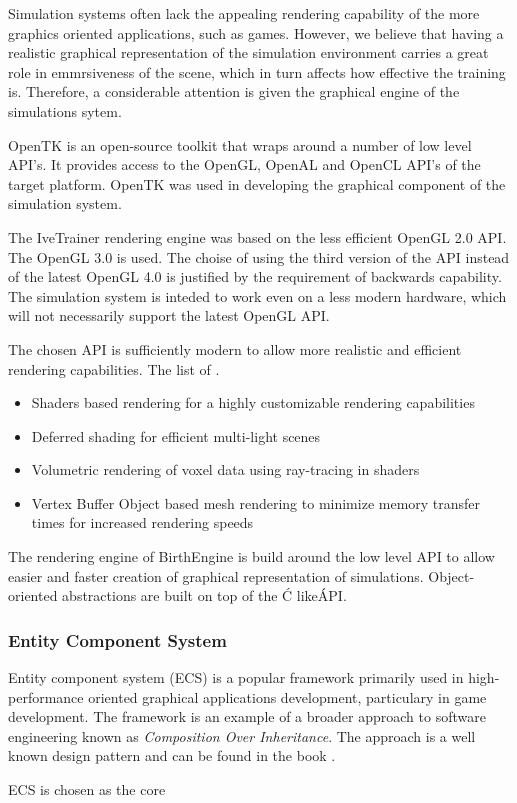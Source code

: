   Simulation systems often lack the appealing rendering capability of the more graphics oriented applications, such as games. However, we believe that having a realistic graphical representation of the simulation environment carries a great role in emmrsiveness of the scene, which in turn affects how effective the training is. Therefore, a considerable attention is given the graphical engine of the simulations sytem.

  OpenTK \citep{opentk} is an open-source toolkit that wraps around a number of low level API's. It provides access to the OpenGL, OpenAL and OpenCL API's of the target platform. OpenTK was used in developing the graphical component of the simulation system.

  The IveTrainer rendering engine was based on the less efficient OpenGL 2.0 API. The OpenGL 3.0 is used. The choise of using the third version of the API instead of the latest OpenGL 4.0 is justified by the requirement of backwards capability. The simulation system is inteded to work even on a less modern hardware, which will not necessarily support the latest OpenGL API.

  The chosen API is sufficiently modern to allow more realistic and efficient rendering capabilities. The list of .

  \begin{itemize}
    \item Shaders based rendering for a highly customizable rendering capabilities
    \item Deferred shading for efficient multi-light scenes
    \item Volumetric rendering of voxel data using ray-tracing in shaders
    \item Vertex Buffer Object based mesh rendering to minimize memory transfer times for increased rendering speeds
  \end{itemize}

  The rendering engine of BirthEngine is build around the low level API to allow easier and faster creation of graphical representation of simulations. Object-oriented abstractions are built on top of the \'C like\' API.

\subsubsection{Entity Component System}

Entity component system (ECS) is a popular framework primarily used in high-performance oriented graphical applications development, particulary in game development. The framework is an example of a broader approach to software engineering known as \textit{Composition Over Inheritance}. The approach is a well known design pattern and can be found in the book \citep{Freeman:2004:HFD:1076324}.

ECS is chosen as the core 
